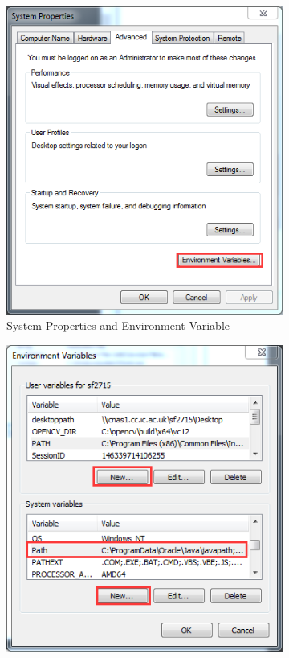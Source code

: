 \begin{enumerate}
\begin{figure}[!h]
\centering
\begin{subfigure}{.5\textwidth}
  \centering
  \includegraphics[scale=0.5]{img/user/system}
  \caption{System Properties and Environment Variable}
  \label{fig:sub1}
\end{subfigure}%
\begin{subfigure}{.5\textwidth}
  \centering
  \includegraphics[scale =0.5]{img/user/variable}

\end{subfigure}
\end{figure}
\end{enumerate}
